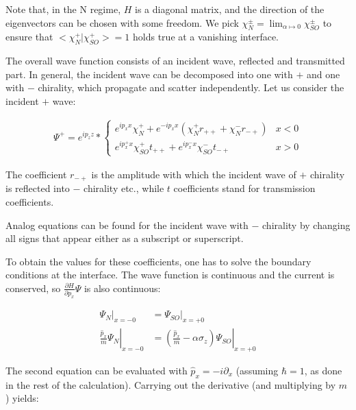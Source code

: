 Note that, in the N regime, $H$ is a diagonal matrix, and the direction
of the eigenvectors can be chosen with some freedom. We pick
$\chi_N^{\pm} = \lim_{\alpha \mapsto 0} \chi_{SO}^{\pm}$ to ensure that
$<\chi_N^+|\chi_{SO}^+> = 1$ holds true at a vanishing interface.



The overall wave function consists of an incident wave, 
reflected and transmitted part. In general, the incident wave can
be decomposed into one with $+$ and one with $-$ chirality, which
propagate and scatter independently. Let us consider the incident $+$
wave:

\begin{align}
    \Psi^+ = e^{i p_z z} * \left\{
        \begin{array}{ll}
            e^{i p_x x} \chi_N^+ + e^{- i p_x x} (\chi_N^+ r_{++} +
                    \chi_N^- r_{-+})    & x < 0\\
            e^{i p_x^+ x} \chi_{SO}^+ t_{++} + e^{i p_x^- x}
            \chi_{SO}^- t_{-+}          & x > 0
        \end{array} \right.
        \label{eq:chiral-wafe-function}
\end{align}

The coefficient $r_{-+}$ is the amplitude with which the incident wave
of $+$ chirality is reflected into $-$ chirality etc., while $t$
coefficients stand for transmission coefficients.

Analog equations can be found for the incident wave with $-$ chirality
by changing all signs that appear either as a subscript or
superscript.

To obtain the values for these coefficients, one has to solve the
boundary conditions at the interface. The wave function is continuous
and the current is conserved, so $\frac{\partial H}{\partial p_x} \Psi$ is also
continuous:

\begin{align}
    \Psi_N|_{x = -0}    &= \Psi_{SO}|_{x = +0} \label{eq:continuous}\\
    \left.\frac{\hat p_x}{m} \Psi_N\right|_{x = -0}
                        &= \left. \left(\frac{\hat p_x}{m} -\alpha \sigma_z\right)
                                \Psi_{SO}\right|_{x = +0}
\end{align}

The second equation can be evaluated with $\hat p_x = -i \partial_x$
(assuming $\hbar = 1$, as done in the rest of the calculation).
Carrying out the derivative (and multiplying by $m$) yields:

